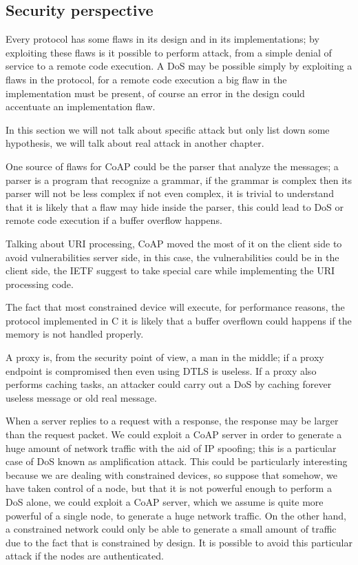 	\subsection{Security perspective}
	Every protocol has some flaws in its design and in its implementations; by exploiting these flaws is it possible to perform attack, from a simple denial of service to a remote code execution.\newline
	A DoS may be possible simply by exploiting a flaws in the protocol, for a remote code execution a big flaw in the implementation must be present, of course an error in the design could accentuate an implementation flaw.
	
	In this section we will not talk about specific attack but only list down some hypothesis, we will talk about real attack in another chapter.
	
	One source of flaws for CoAP could be the parser that analyze the messages; a parser is a program that recognize a grammar, if the grammar is complex then its parser will not be less complex if not even complex, it is trivial to understand that it is likely that a flaw may hide inside the parser, this could lead to DoS or remote code execution if a buffer overflow happens.
	
	Talking about URI processing, CoAP moved the most of it on the client side to avoid vulnerabilities server side, in this case, the vulnerabilities could be in the client side, the IETF suggest to take special care while implementing the URI processing code.
	
	The fact that most constrained device will execute, for performance reasons, the protocol implemented in C it is likely that a buffer overflown could happens if the memory is not handled properly. 
	
	A proxy is, from the security point of view, a man in the middle; if a proxy endpoint is compromised then even using DTLS is useless.\newline
	If a proxy also performs caching tasks, an attacker could carry out a DoS by caching forever useless message or old real message.
	
	When a server replies to a request with a response, the response may be larger than the request packet.
	We could exploit a CoAP server in order to generate a huge amount of network traffic with the aid of IP spoofing; this is a particular case of DoS known as amplification attack.\newline
	This could be particularly interesting because we are dealing with constrained devices, so suppose that somehow, we have taken control of a node, but that it is not powerful enough to perform a DoS alone, we could exploit a CoAP server, which we assume is quite more powerful of a single node, to generate a huge network traffic.\newline
	On the other hand, a constrained network could only be able to generate a small amount of traffic due to the fact that is constrained by design.\newline
	It is possible to avoid this particular attack if the nodes are authenticated.
	
